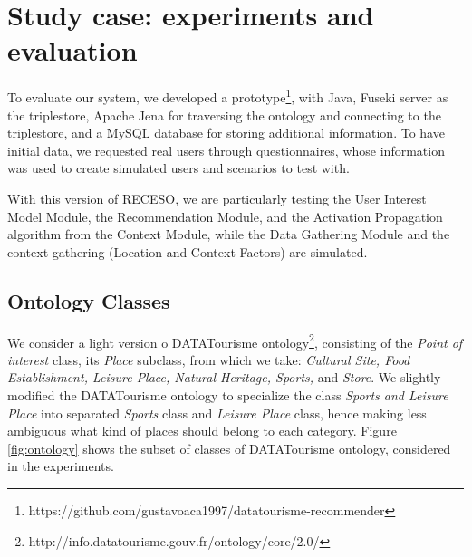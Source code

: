 \section{Study case: experiments and evaluation} \label{section:study-case}

To evaluate our system,  we developed a prototype\footnote{https://github.com/gustavoaca1997/datatourisme-recommender}, with Java, 
Fuseki server as the triplestore, Apache Jena for traversing the ontology and connecting to the triplestore, and a MySQL database for storing additional information.
To have initial data, we requested real users through questionnaires, whose information was used to  create simulated users and scenarios to test with.

With this version of RECESO, we are particularly testing the User Interest Model Module, the Recommendation Module, and the Activation Propagation algorithm from the Context Module, while the Data Gathering Module and the context gathering (Location and Context Factors) are simulated.


\subsection{Ontology Classes}
We consider a light version o DATATourisme ontology\footnote{http://info.datatourisme.gouv.fr/ontology/core/2.0/}, consisting of the \textit{Point of interest} class, its \textit{Place} subclass, from which we take: \textit{Cultural Site, Food Establishment, Leisure Place, Natural Heritage, Sports,} and \textit{Store}.  We slightly modified the DATATourisme ontology to specialize the class \textit{Sports and Leisure Place} into separated  \textit{Sports} class and \textit{Leisure Place} class, hence making less ambiguous what kind of places should belong to each category. Figure \ref{fig:ontology} shows the subset of classes of DATATourisme ontology, considered  in the experiments.


